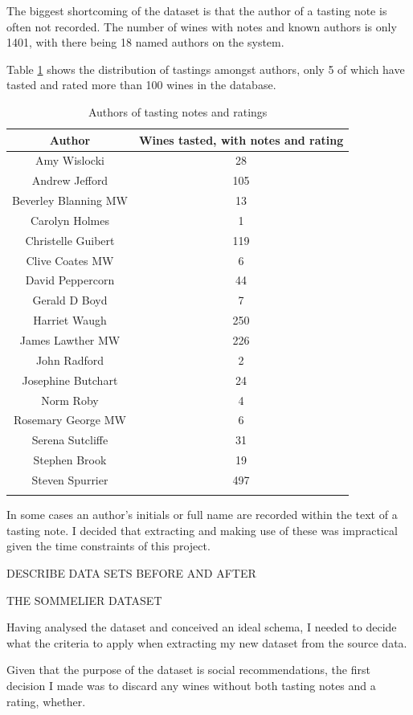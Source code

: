 
The biggest shortcoming of the dataset is that the author of a tasting note is often not recorded. The number of wines with notes and known authors is only 1401, with there being 18 named authors on the system. 

Table \ref{table:authors} shows the distribution of tastings amongst authors, only 5 of which have tasted and rated more than 100 wines in the database.

\begin{table}[ht]
\caption{Authors of tasting notes and ratings}
\centering
\begin{tabular}{c c}
\\\hline\hline
Author               & Wines tasted, with notes and rating
\\\hline
Amy Wislocki         &            28 \\
Andrew Jefford       &           105 \\
Beverley Blanning MW &            13 \\
Carolyn Holmes       &             1 \\
Christelle Guibert   &           119 \\
Clive Coates MW      &             6 \\
David Peppercorn     &            44 \\
Gerald D Boyd        &             7 \\
Harriet Waugh        &           250 \\
James Lawther MW     &           226 \\
John Radford         &             2 \\
Josephine Butchart   &            24 \\
Norm Roby            &             4 \\
Rosemary George MW   &             6 \\
Serena Sutcliffe     &            31 \\
Stephen Brook        &            19 \\
Steven Spurrier      &           497 \\
\\\hline
\end{tabular}
\label{table:authors}
\end{table}

In some cases an author's initials or full name are recorded within the text of a tasting note. I decided that extracting and making use of these was impractical given the time constraints of this project.

DESCRIBE DATA SETS BEFORE AND AFTER

THE SOMMELIER DATASET

Having analysed the dataset and conceived an ideal schema, I needed to decide what the criteria to apply when extracting my new dataset from the source data.

Given that the purpose of the dataset is social recommendations, the first decision I made was to discard any wines without both tasting notes and a rating, whether.

